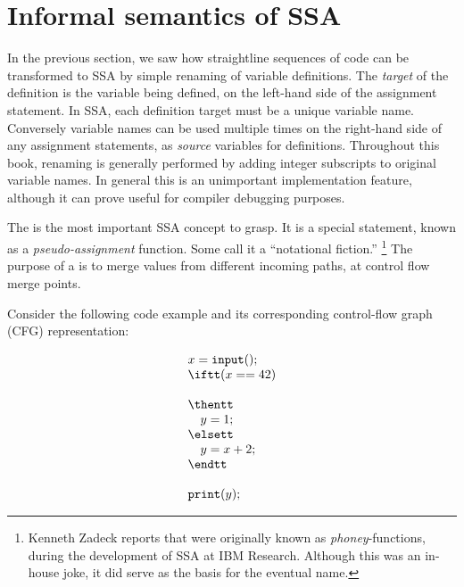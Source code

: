 


\section{Informal semantics of SSA}
In the previous section, we saw how straightline sequences of code can be transformed to SSA by simple renaming of variable definitions. 
The \textit{target} of the definition is the variable being defined, on the left-hand side of the assignment statement. 
In SSA, each definition target must be a unique variable name. 
Conversely variable names can be used multiple times on the right-hand side of any assignment statements, as \textit{source} variables for definitions. 
Throughout this book, renaming is generally performed by adding integer subscripts to original variable names. 
In general this is an unimportant implementation feature, although it can prove useful for compiler debugging purposes.

The \phifun\index{\phifun} is the most important SSA concept to grasp. 
It is a special statement, known as a \textit{pseudo-assignment} function. 
Some call it a ``notational fiction.''
\footnote{ Kenneth Zadeck reports that \phifuns were originally known as \textit{phoney}-functions, during the development of SSA at IBM Research. 
Although this was an in-house joke, it did serve as the basis for the eventual name. 
} The purpose of a \phifun{} is to merge values from different incoming paths, at control flow merge points.

Consider the following code example and its corresponding control-flow graph (CFG) representation:
\smallskip

\begin{minipage}{0.35\textwidth}%
\begin{equation*}
\begin{array}{l}
x = \texttt{input}();\\
\iftt (x == 42)\\
\\
\thentt\\
\quad    y = 1;\\
\elsett\\
\quad    y = x+2;\\
\endtt\\
\\
\texttt{print}(y);%
\end{array}%
\end{equation*}%
\end{minipage}
\begin{minipage}{0.5\textwidth}%
\strut
\end{minipage}
\bigskip



